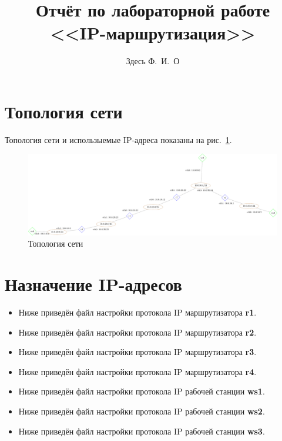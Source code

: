 \documentclass[a4paper,12pt]{article}
\title{Отчёт по лабораторной работе \\ <<IP-маршрутизация>>}
\author{Здесь Ф.~И.~О}
\begin{document}
\maketitle

\tableofcontents

\clearpage


\section{Топология сети}

Топология сети и использыемые IP-адреса показаны на рис.~\ref{fig:network}.

\begin{figure}[h]
\centering
\includegraphics[width=\textwidth]{includes/network_gv.pdf}
\caption{Топология сети}
\label{fig:network}
\end{figure}


\section{Назначение IP-адресов}
\begin{itemize}
\item Ниже приведён файл настройки протокола IP маршрутизатора \textbf{r1}.

\item Ниже приведён файл настройки протокола IP маршрутизатора \textbf{r2}.

\item Ниже приведён файл настройки протокола IP маршрутизатора \textbf{r3}.

\item Ниже приведён файл настройки протокола IP маршрутизатора \textbf{r4}.


\item Ниже приведён файл настройки протокола IP рабочей станции \textbf{ws1}.

\item Ниже приведён файл настройки протокола IP рабочей станции \textbf{ws2}.

\item Ниже приведён файл настройки протокола IP рабочей станции \textbf{ws3}.

\end{itemize}
\end{document}

